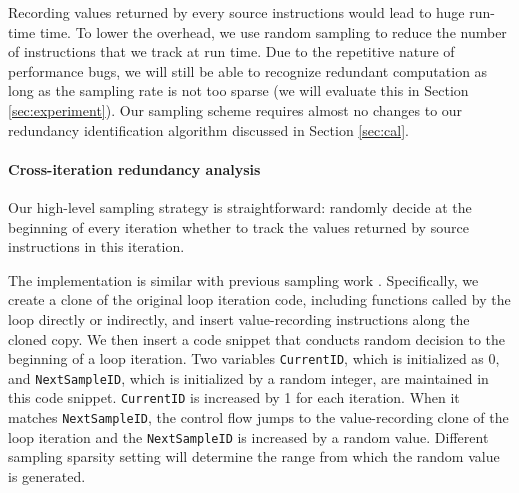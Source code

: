 
Recording values returned by every source instructions would lead to 
huge run-time time. To lower the overhead,
we use random sampling to reduce the number of instructions that we
track at run time. Due to the repetitive nature of performance bugs,
we will still be able to recognize redundant 
computation as long as the sampling rate is not too sparse (we will evaluate
this in Section \ref{sec:experiment}). 
Our sampling scheme requires almost no changes to our redundancy 
identification algorithm discussed in Section \ref{sec:cal}.




\paragraph{Cross-iteration redundancy analysis}
Our high-level sampling strategy is straightforward:
randomly decide at the
beginning of every iteration whether to track the values returned by
source instructions in this iteration.

The implementation is similar with previous sampling work 
\citep{liblit03,liblit05}.
Specifically, we create a clone of the original
loop iteration code, including functions called by the loop directly or
indirectly, and insert value-recording instructions along the
cloned copy. 
We then insert a code snippet that conducts random decision to
the beginning of a loop iteration. 
Two variables \texttt{CurrentID}, which is initialized as 0, 
and \texttt{NextSampleID}, which is initialized by a random integer, 
are maintained
in this code snippet. \texttt{CurrentID} is increased by 1
for each iteration. When it matches \texttt{NextSampleID}, the control
flow jumps to the value-recording clone of the loop iteration and the 
\texttt{NextSampleID} is increased by a random value. Different sampling
sparsity setting will determine the range from which the random value is
generated.

